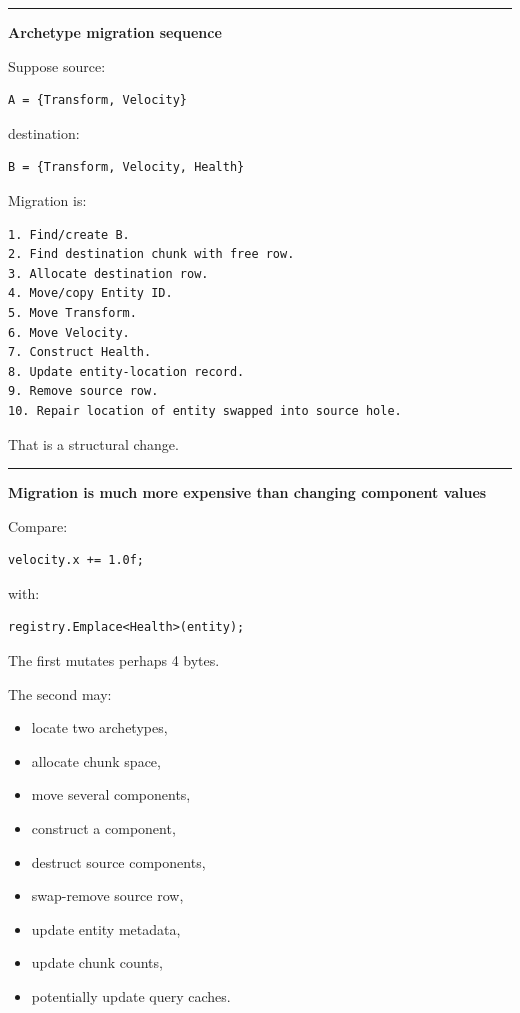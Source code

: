 \begin{center}\rule{0.5\linewidth}{0.5pt}\end{center}

\textbf{Archetype migration sequence}

Suppose source:

\begin{verbatim}
A = {Transform, Velocity}
\end{verbatim}

destination:

\begin{verbatim}
B = {Transform, Velocity, Health}
\end{verbatim}

Migration is:

\begin{verbatim}
1. Find/create B.
2. Find destination chunk with free row.
3. Allocate destination row.
4. Move/copy Entity ID.
5. Move Transform.
6. Move Velocity.
7. Construct Health.
8. Update entity-location record.
9. Remove source row.
10. Repair location of entity swapped into source hole.
\end{verbatim}

That is a structural change.

\begin{center}\rule{0.5\linewidth}{0.5pt}\end{center}

\textbf{Migration is much more expensive than changing component values}

Compare:

\begin{verbatim}
velocity.x += 1.0f;
\end{verbatim}

with:

\begin{verbatim}
registry.Emplace<Health>(entity);
\end{verbatim}

The first mutates perhaps 4 bytes.

The second may:

\begin{itemize}
\tightlist
\item
  locate two archetypes,
\item
  allocate chunk space,
\item
  move several components,
\item
  construct a component,
\item
  destruct source components,
\item
  swap-remove source row,
\item
  update entity metadata,
\item
  update chunk counts,
\item
  potentially update query caches.
\end{itemize}

